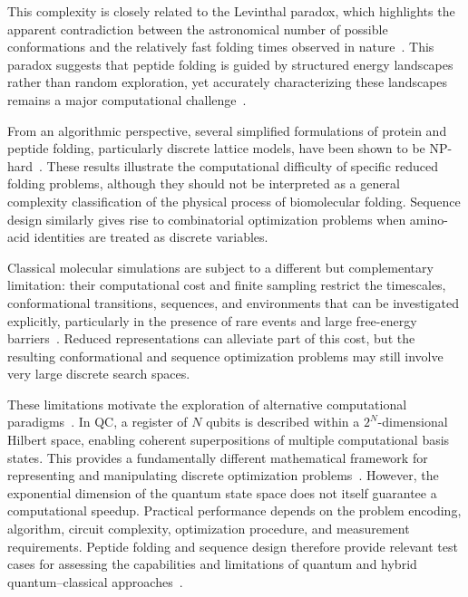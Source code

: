 This complexity is closely related to the Levinthal paradox, which highlights the apparent contradiction between the astronomical number of possible conformations and the relatively fast folding times observed in nature~\cite{Levinthal_paradox}. This paradox suggests that peptide folding is guided by structured energy landscapes rather than random exploration, yet accurately characterizing these landscapes remains a major computational challenge~\cite{Levinthal_paradox_2}.

From an algorithmic perspective, several simplified formulations of protein and peptide folding, particularly discrete lattice models, have been shown to be NP-hard~\cite{robert2021resource,Gainza2016}. These results illustrate the computational difficulty of specific reduced folding problems, although they should not be interpreted as a general complexity classification of the physical process of biomolecular folding. Sequence design similarly gives rise to combinatorial optimization problems when amino-acid identities are treated as discrete variables. 

Classical molecular simulations are subject to a different but complementary limitation: their computational cost and finite sampling restrict the timescales, conformational transitions, sequences, and environments that can be investigated explicitly, particularly in the presence of rare events and large free-energy barriers~\cite{avances_3,limitaciones_md}. Reduced representations can alleviate part of this cost, but the resulting conformational and sequence optimization problems may still involve very large discrete search spaces. 

These limitations motivate the exploration of alternative computational paradigms~\cite{Gainza2016}. In QC, a register of $N$ qubits is described within a $2^N$-dimensional Hilbert space, enabling coherent superpositions of multiple computational basis states. This provides a fundamentally different mathematical framework for representing and manipulating discrete optimization problems~\cite{robert2021resource}. However, the exponential dimension of the quantum state space does not itself guarantee a computational speedup. Practical performance depends on the problem encoding, algorithm, circuit complexity, optimization procedure, and measurement requirements. Peptide folding and sequence design therefore provide relevant test cases for assessing the capabilities and limitations of quantum and hybrid quantum--classical approaches~\cite{quantum_biology_1,quantum_biology_2}.

